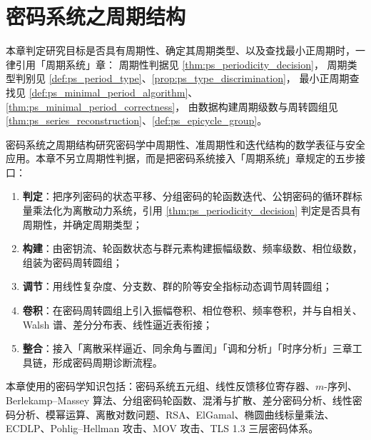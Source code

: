 \chapter{密码系统之周期结构}
\label{chap:crypto-periodic}

\begin{remark}[本章目标的周期性判定（引用）]\label{rem:crypto_ps_hook}
本章判定研究目标是否具有周期性、确定其周期类型、以及查找最小正周期时，一律引用「周期系统」章：
周期性判据见 \cref{thm:ps_periodicity_decision}，
周期类型判别见 \cref{def:ps_period_type}、\cref{prop:ps_type_discrimination}，
最小正周期查找见 \cref{def:ps_minimal_period_algorithm}、\cref{thm:ps_minimal_period_correctness}，
由数据构建周期级数与周转圆组见 \cref{thm:ps_series_reconstruction}、\cref{def:ps_epicycle_group}。
\end{remark}

\begin{remark}\label{rem:crypto_chapter_positioning}
密码系统之周期结构研究密码学中周期性、准周期性和迭代结构的数学表征与安全应用。本章不另立周期性判据，而是把密码系统接入「周期系统」章规定的五步接口：
\begin{enumerate}[label=(\arabic*)]
    \item \textbf{判定}：把序列密码的状态平移、分组密码的轮函数迭代、公钥密码的循环群标量乘法化为离散动力系统，引用 \cref{thm:ps_periodicity_decision} 判定是否具有周期性，并确定周期类型；
    \item \textbf{构建}：由密钥流、轮函数状态与群元素构建振幅级数、频率级数、相位级数，组装为密码周转圆组；
    \item \textbf{调节}：用线性复杂度、分支数、群的阶等安全指标动态调节周转圆组；
    \item \textbf{卷积}：在密码周转圆组上引入振幅卷积、相位卷积、频率卷积，并与自相关、Walsh 谱、差分分布表、线性逼近表衔接；
    \item \textbf{整合}：接入「离散采样逼近、同余角与置闰」「调和分析」「时序分析」三章工具链，形成密码周期诊断流程。
\end{enumerate}
本章使用的密码学知识包括：密码系统五元组、线性反馈移位寄存器、\(m\)-序列、Berlekamp--Massey 算法、分组密码轮函数、混淆与扩散、差分密码分析、线性密码分析、模幂运算、离散对数问题、RSA、ElGamal、椭圆曲线标量乘法、ECDLP、Pohlig--Hellman 攻击、MOV 攻击、TLS 1.3 三层密码体系。
\end{remark}

